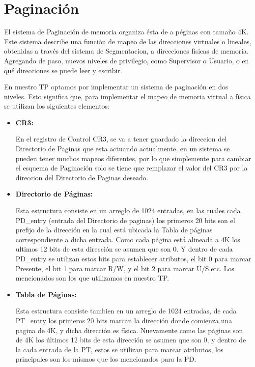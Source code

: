 \section{Paginación}
\par{El sistema de Paginación de memoria organiza ésta de a péginas con tamaño 4K. Este sistema describe una función de mapeo de las direcciones virtuales o lineales, obtenidas a través del sistema de Segmentacion, a direcciones físicas de memoria. Agregando de paso, nuevos niveles de privilegio, como Supervisor o Usuario, o en qué direcciones se puede leer y escribir.}
\par{En nuestro TP optamos por implementar un sistema de paginación en dos niveles. Esto significa que, para implementar el mapeo de memoria virtual a física se utilizan los siguientes elementos: }
\begin{itemize}
	\item {\bfseries CR3: }
	\par{ En el registro de Control CR3, se va a tener guardado la direccion del Directorio de Paginas que esta actuando actualmente, en un sistema se pueden tener muchos mapeos diferentes, por lo que simplemente para cambiar el esquema de Paginación solo se tiene que remplazar el valor del CR3 por la direccion del Directorio de Paginas deseado.}
	\item {\bfseries Directorio de Páginas: }
	\par{Esta estructura consiste en un arreglo de 1024 entradas, en las cuales cada PD\_entry (entrada del Directorio de paginas) los primeros 20 bits son el prefijo de la dirección en la cual está ubicada la Tabla de páginas correspondiente a dicha entrada. Como cada página está alineada a 4K los ultimos 12 bits de esta dirección se asumen que son 0. Y dentro de cada PD\_entry se utilizan estos bits para establecer atributos, el bit 0 para marcar Presente, el bit 1 para marcar R/W, y el bit 2 para marcar U/S,etc. Los mencionados son los que utilizamos en nuestro TP.}
	\item {\bfseries Tabla de Páginas: }
	\par{Esta estructura consiste tambien en un arreglo de 1024 entradas, de cada PT\_entry los primeros 20 bits marcan la dirección donde comienza una pagina de 4K, y dicha dirección es física. Nuevamente como las páginas son de 4K los últimos 12 bits de esta dirección se asumen que son 0, y dentro de la cada entrada de la PT, estos se utilizan para marcar atributos, los principales son los mismos que los mencionados para la PD.}
\end{itemize}

